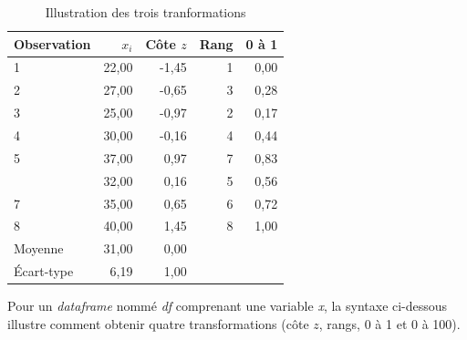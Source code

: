 \documentclass[
  11pt,
  french,
]{book}
\begin{document}
\begin{table}

\caption{\label{tab:AutresTransformation}Illustration des trois tranformations}
\centering
\fontsize{8}{10}\selectfont
\begin{tabular}[t]{lrrrr}
\toprule
Observation & $x_i$ & Côte $z$ & Rang & 0 à 1\\
\midrule
1 & 22,00 & -1,45 & 1 & 0,00\\
2 & 27,00 & -0,65 & 3 & 0,28\\
3 & 25,00 & -0,97 & 2 & 0,17\\
4 & 30,00 & -0,16 & 4 & 0,44\\
5 & 37,00 & 0,97 & 7 & 0,83\\
\addlinespace
6 & 32,00 & 0,16 & 5 & 0,56\\
7 & 35,00 & 0,65 & 6 & 0,72\\
8 & 40,00 & 1,45 & 8 & 1,00\\
Moyenne & 31,00 & 0,00 &  & \\
Écart-type & 6,19 & 1,00 &  & \\
\bottomrule
\end{tabular}
\end{table}

Pour un \emph{dataframe} nommé \emph{df} comprenant une variable \emph{x}, la syntaxe ci-dessous illustre comment obtenir quatre transformations (côte \(z\), rangs, 0 à 1 et 0 à 100).
\end{document}
